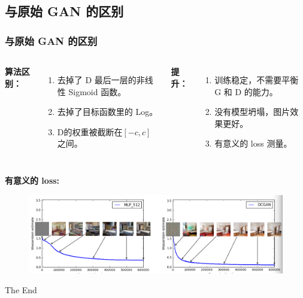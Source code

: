 \documentclass[xelatex]{beamer}
\begin{document}
\subsection{与原始 GAN 的区别}
\begin{frame}
  \frametitle{与原始 GAN 的区别}
  \begin{columns}[t]
    \textbf{算法区别：}
    \begin{enumerate}
      \item 去掉了 D 最后一层的非线性 Sigmoid 函数。
      \item 去掉了目标函数里的 Log。
      \item D的权重被截断在$[-c, c]$之间。
    \end{enumerate}
    \textbf{提升：}
    \begin{enumerate}
      \item 训练稳定，不需要平衡 G 和 D 的能力。
      \item 没有模型坍塌，图片效果更好。
      \item 有意义的 loss 测量。
    \end{enumerate}
  \end{columns}
  \vspace{4mm}
  \textbf{有意义的 loss:}
  \begin{figure}
  \includegraphics[width=0.65\linewidth]{w_estimate}
  \end{figure}
\end{frame}

\begin{frame}
\Huge{\centerline{The End}}
\end{frame}
\end{document}
